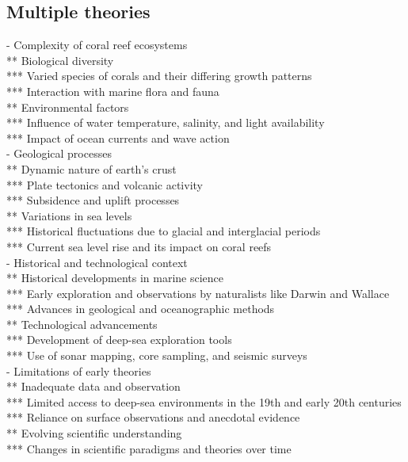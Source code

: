 \subsection{Multiple theories}
- Complexity of coral reef ecosystems \\
** Biological diversity \\
*** Varied species of corals and their differing growth patterns \\
*** Interaction with marine flora and fauna \\
** Environmental factors \\
*** Influence of water temperature, salinity, and light availability \\
*** Impact of ocean currents and wave action \\
- Geological processes \\
** Dynamic nature of earth's crust \\
*** Plate tectonics and volcanic activity \\
*** Subsidence and uplift processes \\
** Variations in sea levels \\
*** Historical fluctuations due to glacial and interglacial periods \\
*** Current sea level rise and its impact on coral reefs \\
- Historical and technological context \\
** Historical developments in marine science \\
*** Early exploration and observations by naturalists like Darwin and Wallace \\
*** Advances in geological and oceanographic methods \\
** Technological advancements \\
*** Development of deep-sea exploration tools \\
*** Use of sonar mapping, core sampling, and seismic surveys \\
- Limitations of early theories \\
** Inadequate data and observation \\
*** Limited access to deep-sea environments in the 19th and early 20th centuries \\
*** Reliance on surface observations and anecdotal evidence \\
** Evolving scientific understanding \\
*** Changes in scientific paradigms and theories over time \\
